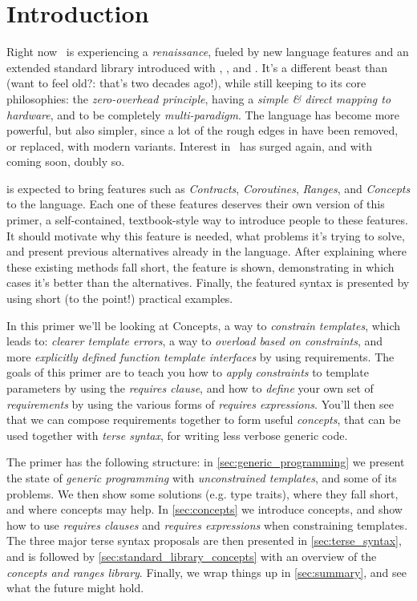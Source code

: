\section{Introduction} \label{sec:introduction}

Right now \Cpp\ is experiencing a \emph{renaissance}, fueled by new language features and an extended standard library introduced with , , and . It's a different beast than  (want to feel old?: that's two decades ago!), while still keeping to its core philosophies: the \emph{zero-overhead principle}, having a \emph{simple \& direct mapping to hardware}, and to be completely \emph{multi-paradigm}. The language has become more powerful, but also simpler, since a lot of the rough edges in  have been removed, or replaced, with modern variants. Interest in \Cpp\ has surged again, and with  coming soon\texttrademark, doubly so.

 is expected to bring features such as \emph{Contracts}, \emph{Coroutines}, \emph{Ranges}, and \emph{Concepts} to the language. Each one of these features deserves their own version of this primer, a self-contained, textbook-style way to introduce people to these features. It should motivate why this feature is needed, what problems it's trying to solve, and present previous alternatives already in the language. After explaining where these existing methods fall short, the feature is shown, demonstrating in which cases it's better than the alternatives. Finally, the featured syntax is presented by using short (to the point!) practical examples.

In this primer we'll be looking at Concepts, a way to \emph{constrain templates}, which leads to: \emph{clearer template errors}, a way to \emph{overload based on constraints}, and more \emph{explicitly defined function template interfaces} by using requirements. The goals of this primer are to teach you how to \emph{apply constraints} to template parameters by using the \emph{requires clause}, and how to \emph{define} your own set of \emph{requirements} by using the various forms of \emph{requires expressions}. You'll then see that we can compose requirements together to form useful \emph{concepts}, that can be used together with \emph{terse syntax}, for writing less verbose generic code.

The primer has the following structure: in \cref{sec:generic_programming} we present the state of \emph{generic programming} with \emph{unconstrained templates}, and some of its problems. We then show some solutions (e.g. type traits), where they fall short, and where concepts may help. In \cref{sec:concepts} we introduce concepts, and show how to use \emph{requires clauses} and \emph{requires expressions} when constraining templates. The three major terse syntax proposals are then presented in \cref{sec:terse_syntax}, and is followed by \cref{sec:standard_library_concepts} with an overview of the \emph{concepts and ranges library}. Finally, we wrap things up in \cref{sec:summary}, and see what the future might hold.


